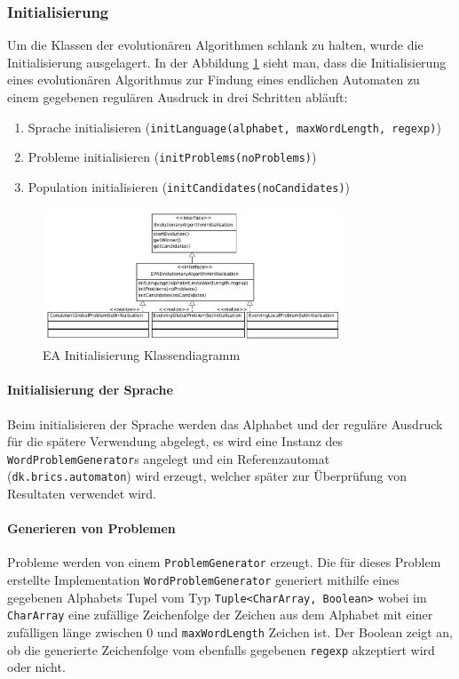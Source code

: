 \subsubsection{Initialisierung}
Um die Klassen der evolutionären Algorithmen schlank zu halten, wurde die Initialisierung ausgelagert. In der Abbildung \ref{fig:ea_init_classdiag_simple} sieht man, dass die Initialisierung eines evolutionären Algorithmus zur Findung eines endlichen Automaten zu einem gegebenen regulären Ausdruck in drei Schritten abläuft:
\begin{enumerate}
	\item Sprache initialisieren (\lstinline$initLanguage(alphabet, maxWordLength, regexp)$)
	\item Probleme initialisieren (\lstinline$initProblems(noProblems)$)
	\item Population initialisieren (\lstinline$initCandidates(noCandidates)$)
\end{enumerate}

\begin{figure}[h]
  \centering
  \includegraphics[width=0.8\textwidth]{images/simple_uml_evolution_initialisation.pdf}
  \caption[EA Initialisierung Klassendiagramm]{EA Initialisierung Klassendiagramm}
  \label{fig:ea_init_classdiag_simple}
\end{figure}

\paragraph{Initialisierung der Sprache}
Beim initialisieren der Sprache werden das Alphabet und der reguläre Ausdruck für die spätere Verwendung abgelegt, es wird eine Instanz des \lstinline$WordProblemGenerator$s angelegt und ein Referenzautomat (\lstinline$dk.brics.automaton$) wird erzeugt, welcher später zur Überprüfung von Resultaten verwendet wird.

\paragraph{Generieren von Problemen}
Probleme werden von einem \lstinline$ProblemGenerator$ erzeugt. Die für dieses Problem erstellte Implementation \lstinline$WordProblemGenerator$ generiert mithilfe eines gegebenen Alphabets Tupel vom Typ \lstinline$Tuple<CharArray, Boolean>$ wobei im \lstinline$CharArray$ eine zufällige Zeichenfolge der Zeichen aus dem Alphabet mit einer zufälligen länge zwischen 0 und \lstinline$maxWordLength$ Zeichen ist. Der Boolean zeigt an, ob die generierte Zeichenfolge vom ebenfalls gegebenen \lstinline$regexp$ akzeptiert wird oder nicht.

